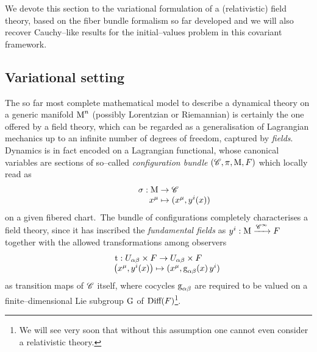 We devote this section to the variational formulation of a (relativistic) field theory, based on the fiber bundle formalism so far developed and we will also recover Cauchy--like results for the initial--values problem in this covariant framework.


\subsection{Variational setting}
The so far most complete mathematical model to describe a dynamical theory on a generic manifold $\text{\normalfont M}^n$ (possibly Lorentzian or Riemannian) is certainly the one offered by a field theory, which can be regarded as a generalisation of Lagrangian mechanics up to an infinite number of degrees of freedom, captured by \emph{fields}. Dynamics is in fact encoded on a Lagrangian functional, whose canonical variables are sections of so--called \emph{configuration bundle} $(\mathscr{C},\pi,\text{\normalfont M},F)$ which locally read as
$$\begin{matrix}
    \sigma:\text{\normalfont M}\to\mathscr{C}\\
    \qquad\qquad\quad x^\mu\mapsto(x^\mu,y^i(x))
\end{matrix}$$
on a given fibered chart.\, The bundle of configurations completely characterises a field theory, since it has inscribed the \emph{fundamental fields} as $y^i:\text{\normalfont M}\xrightarrow{\mathscr{C}^\infty}F$
together with the allowed transformations among observers 
    $$\begin{matrix}
        \text{\normalfont t}:U_{\alpha\beta}\times F\to U_{\alpha\beta}\times F\\
        \qquad\left(x^\mu,y^i(x)\right)\mapsto(x^\mu,\text{\normalfont g}_{\alpha\beta}(x)\,y^i)
    \end{matrix}$$
as transition maps of $\mathscr{C}$ itself, where cocycles $\text{\normalfont g}_{\alpha\beta}$ are required to be valued on a finite--dimensional Lie subgroup $\text{\normalfont G}$ of $\text{\normalfont Diff}(F)$\footnote{We will see very soon that without this assumption one cannot even consider a relativistic theory.}.

